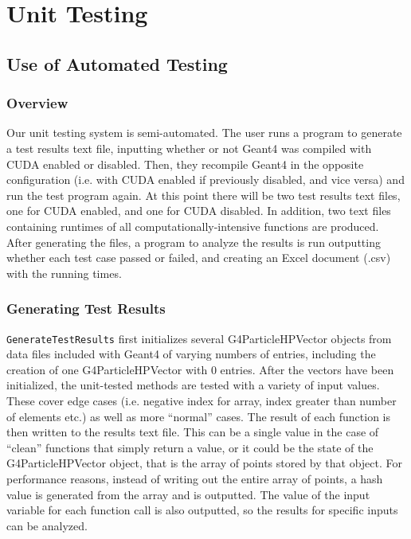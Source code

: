 \documentclass[12pt]{article}
\newcommand{\todo}[1]{\textcolor{red}{[TODO: #1]}} \else
\newcommand{\authornote}[3]{} \newcommand{\todo}[1]{} \fi
\newcommand{\mmp}[1]{\authornote{green}{MP}{#1}}
\begin{document}
\mmp{Not using G4-STORK for system tests - therefore had to change system tests}
\section{Unit Testing}
\subsection{Use of Automated Testing}
\subsubsection{Overview}
Our unit testing system is semi-automated. The user runs a program to generate a test results text file, inputting whether or not Geant4 was compiled with CUDA enabled or disabled. Then, they recompile Geant4 in the opposite configuration (i.e. with CUDA enabled if previously disabled, and vice versa) and run the test program again. At this point there will be two test results text files, one for CUDA enabled, and one for CUDA disabled. In addition, two text files containing runtimes of all computationally-intensive functions are produced. After generating the files, a program to analyze the results is run outputting whether each test case passed or failed, and creating an Excel document (.csv) with the running times.

\subsubsection{Generating Test Results}
\texttt{GenerateTestResults} first initializes several G4ParticleHPVector objects from data files included with Geant4 of varying numbers of entries, including the creation of one G4ParticleHPVector with 0 entries. After the vectors have been initialized, the unit-tested methods are tested with a variety of input values. These cover edge cases (i.e. negative index for array, index greater than number of elements etc.) as well as more ``normal'' cases. The result of each function is then written to the results text file. This can be a single value in the case of ``clean'' functions that simply return a value, or it could be the state of the G4ParticleHPVector object, that is the array of points stored by that object. For performance reasons, instead of writing out the entire array of points, a hash value is generated from the array and is outputted. The value of the input variable for each function call is also outputted, so the results for specific inputs can be analyzed.
\end{document}
